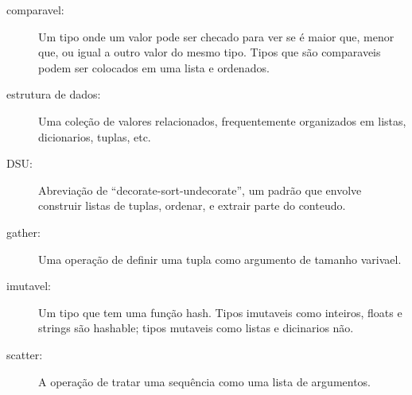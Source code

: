 \begin{description}

\item[comparavel:] Um tipo onde um valor pode ser checado para ver se é
maior que, menor que, ou igual a outro valor do mesmo tipo.
Tipos que são comparaveis podem ser colocados em uma lista e ordenados.

\item[estrutura de dados:] Uma coleção de valores relacionados, 
frequentemente organizados em listas, dicionarios, tuplas, etc.

\item[DSU:] Abreviação de ``decorate-sort-undecorate'', um
padrão que envolve construir listas de tuplas, ordenar, e 
extrair parte do conteudo.

\item[gather:] Uma operação de definir uma tupla como argumento 
de tamanho varivael.

\item[imutavel:] Um tipo que tem uma função hash. Tipos imutaveis
como inteiros,
floats e strings são hashable; tipos mutaveis como listas e
dicinarios não.

\item[scatter:] A operação de tratar uma sequência como uma lista de
argumentos.


\end{description}
